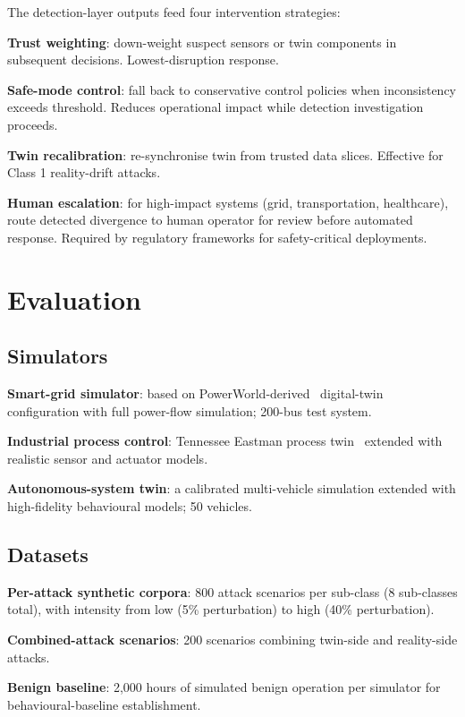 \documentclass[sigconf,nonacm]{acmart}
\begin{document}
The detection-layer outputs feed four intervention strategies:

\textbf{Trust weighting}: down-weight suspect sensors or twin
components in subsequent decisions. Lowest-disruption response.

\textbf{Safe-mode control}: fall back to conservative control
policies when inconsistency exceeds threshold. Reduces operational
impact while detection investigation proceeds.

\textbf{Twin recalibration}: re-synchronise twin from trusted
data slices. Effective for Class 1 reality-drift attacks.

\textbf{Human escalation}: for high-impact systems (grid,
transportation, healthcare), route detected divergence to human
operator for review before automated response. Required by
regulatory frameworks for safety-critical deployments.

\section{Evaluation}

\subsection{Simulators}

\textbf{Smart-grid simulator}: based on
PowerWorld-derived~\cite{powerworld2024} digital-twin
configuration with full power-flow simulation; 200-bus test
system.

\textbf{Industrial process control}: Tennessee Eastman process
twin~\cite{downs1993te} extended with realistic sensor and actuator
models.

\textbf{Autonomous-system twin}: a calibrated multi-vehicle
simulation extended with high-fidelity behavioural models; 50
vehicles.

\subsection{Datasets}

\textbf{Per-attack synthetic corpora}: 800 attack scenarios per
sub-class (8 sub-classes total), with intensity from low (5\%
perturbation) to high (40\% perturbation).

\textbf{Combined-attack scenarios}: 200 scenarios combining
twin-side and reality-side attacks.

\textbf{Benign baseline}: 2{,}000 hours of simulated benign
operation per simulator for behavioural-baseline establishment.
\end{document}
